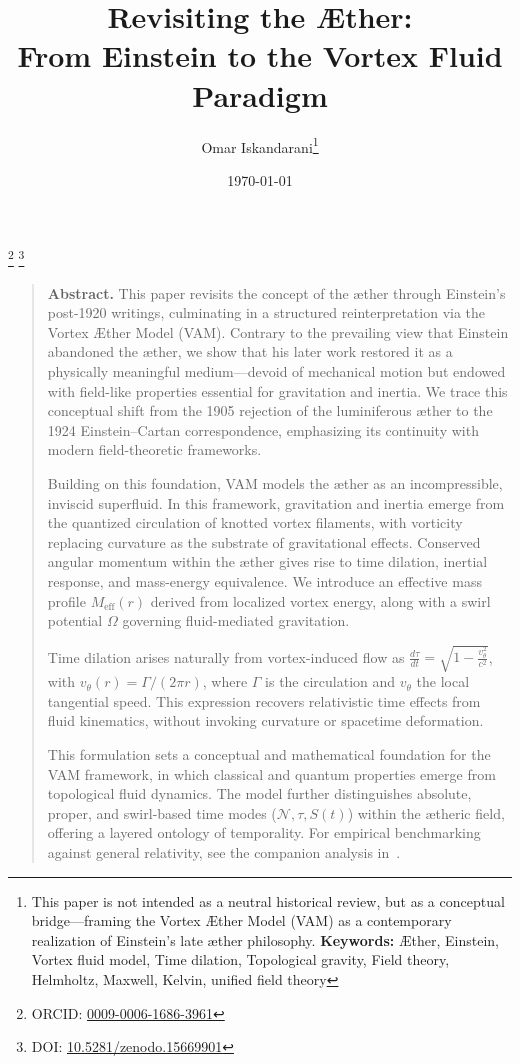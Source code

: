 \documentclass[preprint]{revtex4-2}
\begin{document}
\title{Revisiting the Æther:\\ From Einstein to the Vortex Fluid Paradigm}
\author{Omar Iskandarani\footnote{\scriptsize This paper is not intended as a neutral historical review, but as a conceptual bridge—framing the Vortex Æther Model (VAM) as a contemporary realization of Einstein’s late æther philosophy. \textbf{Keywords:} Æther, Einstein, Vortex fluid model, Time dilation, Topological gravity, Field theory, Helmholtz, Maxwell, Kelvin, unified field theory}}
\thanks{ORCID: \href{https://orcid.org/0009-0006-1686-3961}{0009-0006-1686-3961}}
\thanks{DOI: \href{https://doi.org/10.5281/zenodo.15669901}{10.5281/zenodo.15669901}}
\date{\today}
\maketitle
\begin{quotation}
    \noindent\textbf{Abstract.}
    This paper revisits the concept of the æther through Einstein’s post-1920 writings, culminating in a structured reinterpretation via the Vortex Æther Model (VAM). Contrary to the prevailing view that Einstein abandoned the æther, we show that his later work restored it as a physically meaningful medium—devoid of mechanical motion but endowed with field-like properties essential for gravitation and inertia. We trace this conceptual shift from the 1905 rejection of the luminiferous æther to the 1924 Einstein–Cartan correspondence, emphasizing its continuity with modern field-theoretic frameworks.

    Building on this foundation, VAM models the æther as an incompressible, inviscid superfluid. In this framework, gravitation and inertia emerge from the quantized circulation of knotted vortex filaments, with vorticity replacing curvature as the substrate of gravitational effects. Conserved angular momentum within the æther gives rise to time dilation, inertial response, and mass-energy equivalence. We introduce an effective mass profile \( M_{\text{eff}}(r) \) derived from localized vortex energy, along with a swirl potential \( \Omega \) governing fluid-mediated gravitation.

    Time dilation arises naturally from vortex-induced flow as \( \frac{d\tau}{dt} = \sqrt{1 - \frac{v_\theta^2}{c^2}} \), with \( v_\theta(r) = \Gamma / (2\pi r) \), where \( \Gamma \) is the circulation and \( v_\theta \) the local tangential speed. This expression recovers relativistic time effects from fluid kinematics, without invoking curvature or spacetime deformation.

    This formulation sets a conceptual and mathematical foundation for the VAM framework, in which classical and quantum properties emerge from topological fluid dynamics. The model further distinguishes absolute, proper, and swirl-based time modes (\( \mathcal{N}, \tau, S(t) \)) within the ætheric field, offering a layered ontology of temporality. For empirical benchmarking against general relativity, see the companion analysis in~\cite{iskandarani2025benchmark}.

\end{quotation}
\end{document}
